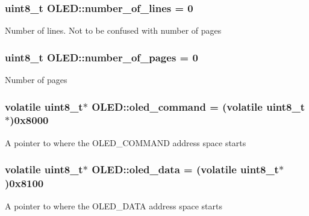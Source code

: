 \subsubsection[{\texorpdfstring{number\+\_\+of\+\_\+lines}{number_of_lines}}]{\setlength{\rightskip}{0pt plus 5cm}uint8\+\_\+t O\+L\+E\+D\+::number\+\_\+of\+\_\+lines = 0\hspace{0.3cm}{\ttfamily [protected]}}\hypertarget{class_o_l_e_d_a9ea1c55112deede1a61142af276a6bc9}{}\label{class_o_l_e_d_a9ea1c55112deede1a61142af276a6bc9}
Number of lines. Not to be confused with number of pages 
\subsubsection[{\texorpdfstring{number\+\_\+of\+\_\+pages}{number_of_pages}}]{\setlength{\rightskip}{0pt plus 5cm}uint8\+\_\+t O\+L\+E\+D\+::number\+\_\+of\+\_\+pages = 0\hspace{0.3cm}{\ttfamily [protected]}}\hypertarget{class_o_l_e_d_aaac99b0eb4e9dfe92b8571488dc89288}{}\label{class_o_l_e_d_aaac99b0eb4e9dfe92b8571488dc89288}
Number of pages 
\subsubsection[{\texorpdfstring{oled\+\_\+command}{oled_command}}]{\setlength{\rightskip}{0pt plus 5cm}volatile uint8\+\_\+t$\ast$ O\+L\+E\+D\+::oled\+\_\+command = (volatile uint8\+\_\+t$\ast$)0x8000\hspace{0.3cm}{\ttfamily [protected]}}\hypertarget{class_o_l_e_d_af0a85ccd0274347b8c1ac77d298a14cf}{}\label{class_o_l_e_d_af0a85ccd0274347b8c1ac77d298a14cf}
A pointer to where the O\+L\+E\+D\+\_\+\+C\+O\+M\+M\+A\+ND address space starts 
\subsubsection[{\texorpdfstring{oled\+\_\+data}{oled_data}}]{\setlength{\rightskip}{0pt plus 5cm}volatile uint8\+\_\+t$\ast$ O\+L\+E\+D\+::oled\+\_\+data = (volatile uint8\+\_\+t$\ast$)0x8100\hspace{0.3cm}{\ttfamily [protected]}}\hypertarget{class_o_l_e_d_a1bc54d49808f92ddfc354511b692df6f}{}\label{class_o_l_e_d_a1bc54d49808f92ddfc354511b692df6f}
A pointer to where the O\+L\+E\+D\+\_\+\+D\+A\+TA address space starts 
